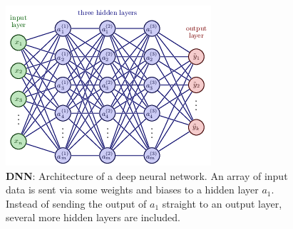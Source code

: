 \begin{figure}
    \centering
    \includegraphics[width=0.5\linewidth]{latex//figures/nn1.png}
    \caption{\textbf{DNN}: Architecture of a deep neural network. An array of input data is sent via some weights and biases to a hidden layer $a_1$. Instead of sending the output of $a_1$ straight to an output layer, several more hidden layers are included.}
    \label{fig:dnn}
\end{figure}






